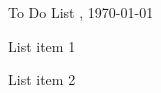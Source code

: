 \documentclass{article}
\newcommand\ytdheader[1]{{\headerfont #1}}
\newcommand\ytddate[1]{{\datefont #1}}
\begin{document}
\ytdheader{To Do List}
\hfill
\ytddate{\datedayname, \today}

\begin{todolist}[leftmargin=*]
\item List item 1
\item List item 2
\end{todolist}
\end{document}
